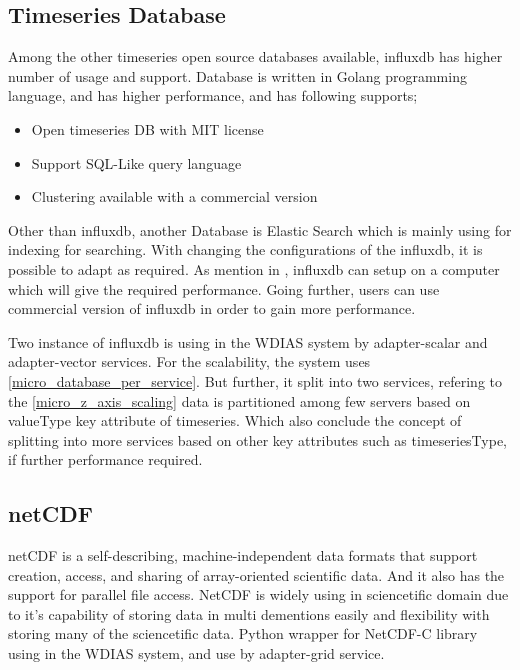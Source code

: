 \subsection{Timeseries Database}
\label{sub:influxdb}
Among the other timeseries open source databases available, \acrshort{influxdb} \cite{influxdbInfluxDBDocumentation} has higher number of usage and support. Database is written in Golang programming language, and has higher performance, and has following supports;
\begin{itemize}
  \item Open timeseries DB with MIT license
  \item Support SQL-Like query language
  \item Clustering available with a commercial version
\end{itemize}
Other than \acrshort{influxdb}, another Database is Elastic Search which is mainly using for indexing for searching.
With changing the configurations of the \acrshort{influxdb}, it is possible to adapt as required. As mention in \cite{influxdbInfluxDBDocumentation}, 
\acrshort{influxdb} can setup on a computer which will give the required performance. Going further, users can use commercial version of \acrshort{influxdb} in order to gain more performance.

Two instance of \acrshort{influxdb} is using in the WDIAS system by adapter-scalar and adapter-vector services. For the scalability, the system uses \ref{micro_database_per_service}.
But further, it split into two services, refering to the \ref{micro_z_axis_scaling} data is partitioned among few servers based on valueType key attribute of timeseries.
Which also conclude the concept of splitting into more services based on other key attributes such as timeseriesType, if further performance required.

\subsection{\acrfull{netCDF}} 
\label{sub:netcdf}
\acrshort{netCDF} \cite{unidataUnidataNetCDF} is a self-describing, machine-independent data formats that support creation, access, and sharing of array-oriented scientific data.
And it also has the support for parallel file access.
NetCDF is widely using in sciencetific domain due to it's capability of storing data in multi dementions easily and flexibility with storing many of the sciencetific data.
Python wrapper for NetCDF-C library using in the WDIAS system, and use by adapter-grid service.

